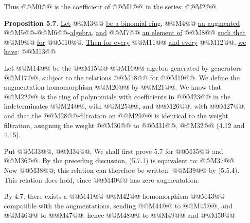 Thus @@M0@@ is the coefficient of @@M1@@ in the series:
@@M2@@

\textbf{Proposition 5.7.} \uline{Let} @@M3@@ \uline{be a binomial ring}, @@M4@@ \uline{an augmented} @@M5@@-@@M6@@-\uline{algebra}, \uline{and} @@M7@@ \uline{an element of} @@M8@@ \uline{such that} @@M9@@ \uline{for} @@M10@@. \uline{Then for every} @@M11@@ \uline{and every} @@M12@@, \uline{we have}:
@@M13@@

Let @@M14@@ be the @@M15@@-@@M16@@-algebra generated by generators @@M17@@, subject to the relations @@M18@@ for @@M19@@. We define the augmentation homomorphism @@M20@@ by @@M21@@. We know that @@M22@@ is the ring of polynomials with coefficients in @@M23@@ in the indeterminates @@M24@@, with @@M25@@, and @@M26@@, with @@M27@@, and that the @@M28@@-filtration on @@M29@@ is identical to the weight filtration, assigning the weight @@M30@@ to @@M31@@, @@M32@@ (4.12 and 4.15).

Put @@M33@@, @@M34@@. We shall first prove 5.7 for @@M35@@ and @@M36@@. By the preceding discussion, (5.7.1) is equivalent to:
@@M37@@
Now @@M38@@; this relation can therefore be written:
@@M39@@
by (5.5.4). This relation does hold, since @@M40@@ has zero augmentation.

By 4.7, there exists a @@M41@@-@@M42@@-homomorphism @@M43@@ compatible with the augmentations, sending @@M44@@ to @@M45@@, and @@M46@@ to @@M47@@, hence @@M48@@ to @@M49@@ and @@M50@@
